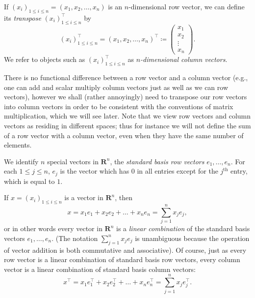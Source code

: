 \begin{definition}[Transpose]\label{6.1.3}
    If \((x_i)_{1 \leq i \leq n} = (x_1, x_2, \dots, x_n)\) is an \(n\)-dimensional row vector, we can define its \emph{transpose} \((x_i)_{1 \leq i \leq n}^\top\) by
    \[
        (x_i)_{1 \leq i \leq n}^\top = (x_1, x_2, \dots, x_n)^\top \coloneqq \begin{pmatrix}
            x_1    \\
            x_2    \\
            \vdots \\
            x_n
        \end{pmatrix}.
    \]
    We refer to objects such as \((x_i)_{1 \leq i \leq n}^\top\) as \emph{\(n\)-dimensional column vectors}.
\end{definition}

\begin{remark}\label{6.1.4}
    There is no functional difference between a row vector and a column vector (e.g., one can add and scalar multiply column vectors just as well as we can row vectors), however we shall (rather annoyingly) need to transpose our row vectors into column vectors in order to be consistent with the conventions of matrix multiplication, which we will see later.
    Note that we view row vectors and column vectors as residing in different spaces;
    thus for instance we will not define the sum of a row vector with a column vector, even when they have the same number of elements.
\end{remark}

\begin{definition}\label{6.1.5}
    We identify \(n\) special vectors in \(\mathbf{R}^n\), the \emph{standard basis row vectors} \(e_1, \dots, e_n\).
    For each \(1 \leq j \leq n\), \(e_j\) is the vector which has \(0\) in all entries except for the \(j^{\text{th}}\) entry, which is equal to \(1\).
\end{definition}

\begin{note}
    If \(x = (x_i)_{1 \leq i \leq n}\) is a vector in \(\mathbf{R}^n\), then
    \[
        x = x_1 e_1 + x_2 e_2 + \dots + x_n e_n = \sum_{j = 1}^n x_j e_j,
    \]
    or in other words every vector in \(\mathbf{R}^n\) is a \emph{linear combination} of the standard basis vectors \(e_1, \dots, e_n\).
    (The notation \(\sum_{j = 1}^n x_j e_j\) is unambiguous because the operation of vector addition is both commutative and associative).
    Of course, just as every row vector is a linear combination of standard basis row vectors, every column vector is a linear combination of standard basis column vectors:
    \[
        x^\top = x_1 e_1^\top + x_2 e_2^\top + \dots + x_n e_n^\top = \sum_{j = 1}^n x_j e_j^\top.
    \]
\end{note}

